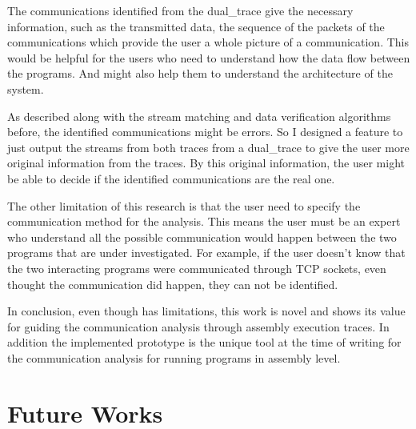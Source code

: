 The communications identified from the dual\_trace give the necessary information, such as the transmitted data, the sequence of the packets of the communications which provide the user a whole picture of a communication. This would be helpful for the users who need to understand how the data flow between the programs. And might also help them to understand the architecture of the system. 

As described along with the stream matching and  data verification algorithms before, the identified communications might be errors. So I designed a feature to just output the streams from both traces from a dual\_trace to give the user more original information from the traces. By this original information, the user might be able to decide if the identified communications are the real one.

The other limitation of this research is that the user need to specify the communication method for the analysis. This means the user must be an expert who understand all the possible communication would happen between the two programs that are under investigated. For example, if the user doesn't know that the two interacting programs were communicated through TCP sockets, even thought the communication did happen, they can not be identified. 

In conclusion, even though has limitations, this work is novel and shows its value for guiding the communication analysis through assembly execution traces. In addition the implemented prototype is the unique tool at the time of writing for the communication analysis for running programs in assembly level.

\section{Future Works}

